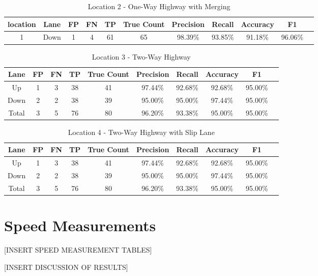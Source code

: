 \begin{table}
    \centering
    \begin{tabular}{|c|c|c|c|c|c|c|c|c|c|c|} 
    \hline
    location & \textbf{Lane} & \textbf{FP} & \textbf{FN}& \textbf{TP}& \textbf{True Count}& 
    \textbf{Precision}& \textbf{Recall}& \textbf{Accuracy} & \textbf{F1}\\
    \hline
    1&Down&1&4&61&65&98.39\%&93.85\%&91.18\%&96.06\%\\
    \hline
\end{tabular}
\caption{Location 2 - One-Way Highway with Merging}
\end{table}
\raggedbottom

\begin{table}
    \centering
    \begin{tabular}{|c|c|c|c|c|c|c|c|c|c|} 
        \hline
        \textbf{Lane} & \textbf{FP} & \textbf{FN}& \textbf{TP}& \textbf{True Count}& 
        \textbf{Precision}& \textbf{Recall}& \textbf{Accuracy} & \textbf{F1}\\
        \hline
        Up&1&3&38&41&97.44\%&92.68\%&92.68\%&95.00\%\\
        \hline
        Down&2&2&38&39&95.00\%&95.00\%&97.44\%&95.00\%\\
        \hline
        Total&3&5&76&80&96.20\%&93.38\%&95.00\%&95.00\%\\
        \hline
    \end{tabular}
    \caption{Location 3 - Two-Way Highway}
    \end{table}

\begin{table}
    \centering
    \begin{tabular}{|c|c|c|c|c|c|c|c|c|c|} 
        \hline
        \textbf{Lane} & \textbf{FP} & \textbf{FN}& \textbf{TP}& \textbf{True Count}& 
        \textbf{Precision}& \textbf{Recall}& \textbf{Accuracy} & \textbf{F1}\\
        \hline
        Up&1&3&38&41&97.44\%&92.68\%&92.68\%&95.00\%\\
        \hline
        Down&2&2&38&39&95.00\%&95.00\%&97.44\%&95.00\%\\
        \hline
        Total&3&5&76&80&96.20\%&93.38\%&95.00\%&95.00\%\\
        \hline
    \end{tabular}
    \caption{Location 4 - Two-Way Highway with Slip Lane}
\end{table}




\section{Speed Measurements}

[INSERT SPEED MEASUREMENT TABLES]

[INSERT DISCUSSION OF RESULTS]

